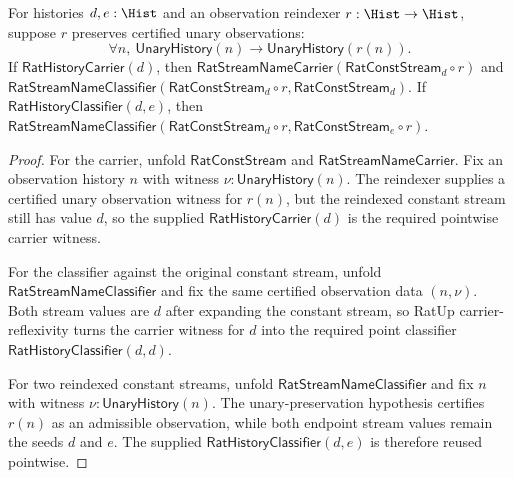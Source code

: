 \begin{theorem}
\label{thm:rat-stream-name-constant-reindexing-classifier}
For histories $d,e:\Hist$ and an observation reindexer $r:\Hist\to\Hist$,
suppose $r$ preserves certified unary observations:
$$
\forall n,\ \mathsf{UnaryHistory}(n)\to\mathsf{UnaryHistory}(r(n)).
$$
If $\mathsf{RatHistoryCarrier}(d)$, then
$\mathsf{RatStreamNameCarrier}(\mathsf{RatConstStream}_d\circ r)$ and
$\mathsf{RatStreamNameClassifier}(\mathsf{RatConstStream}_d\circ r,
\mathsf{RatConstStream}_d)$. If $\mathsf{RatHistoryClassifier}(d,e)$, then
$\mathsf{RatStreamNameClassifier}(\mathsf{RatConstStream}_d\circ r,
\mathsf{RatConstStream}_e\circ r)$.
\end{theorem}
\begin{proof}
For the carrier, unfold $\mathsf{RatConstStream}$ and
$\mathsf{RatStreamNameCarrier}$. Fix an observation history $n$ with witness
$\nu:\mathsf{UnaryHistory}(n)$. The reindexer supplies a certified unary
observation witness for $r(n)$, but the reindexed constant stream still has
value $d$, so the supplied $\mathsf{RatHistoryCarrier}(d)$ is the required
pointwise carrier witness.

For the classifier against the original constant stream, unfold
$\mathsf{RatStreamNameClassifier}$ and fix the same certified observation data
$(n,\nu)$. Both stream values are $d$ after expanding the constant stream, so
RatUp carrier-reflexivity turns the carrier witness for $d$ into the required
point classifier $\mathsf{RatHistoryClassifier}(d,d)$.

For two reindexed constant streams, unfold
$\mathsf{RatStreamNameClassifier}$ and fix $n$ with witness
$\nu:\mathsf{UnaryHistory}(n)$. The unary-preservation hypothesis certifies
$r(n)$ as an admissible observation, while both endpoint stream values remain
the seeds $d$ and $e$. The supplied
$\mathsf{RatHistoryClassifier}(d,e)$ is therefore reused pointwise.
\end{proof}

